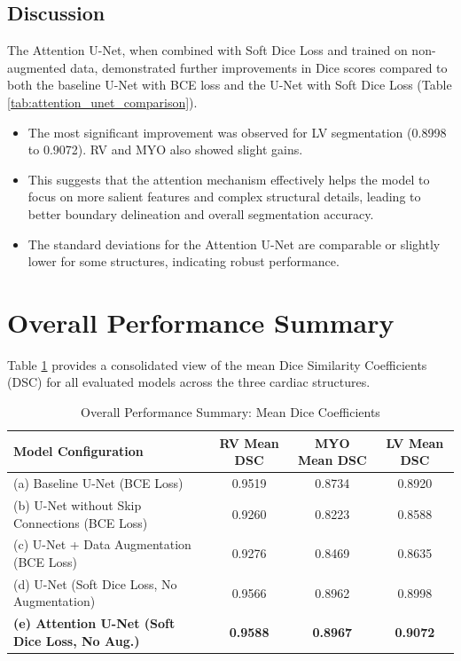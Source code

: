 \documentclass{article}
\begin{document}
\subsection{Discussion}
The Attention U-Net, when combined with Soft Dice Loss and trained on non-augmented data, demonstrated further improvements in Dice scores compared to both the baseline U-Net with BCE loss and the U-Net with Soft Dice Loss (Table \ref{tab:attention_unet_comparison}).
\begin{itemize}
  \item The most significant improvement was observed for LV segmentation (0.8998 to 0.9072). RV and MYO also showed slight gains.
  \item This suggests that the attention mechanism effectively helps the model to focus on more salient features and complex structural details, leading to better boundary delineation and overall segmentation accuracy.
  \item The standard deviations for the Attention U-Net are comparable or slightly lower for some structures, indicating robust performance.
\end{itemize}

\section{Overall Performance Summary}
Table \ref{tab:overall_summary} provides a consolidated view of the mean Dice Similarity Coefficients (DSC) for all evaluated models across the three cardiac structures.

\begin{table}[H]
  \centering
  \caption{Overall Performance Summary: Mean Dice Coefficients}
  \label{tab:overall_summary}
  \begin{tabular}{lccc}
    \toprule
    Model Configuration                                    & RV Mean DSC     & MYO Mean DSC    & LV Mean DSC     \\
    \midrule
    (a) Baseline U-Net (BCE Loss)                          & 0.9519          & 0.8734          & 0.8920          \\
    (b) U-Net without Skip Connections (BCE Loss)          & 0.9260          & 0.8223          & 0.8588          \\
    (c) U-Net + Data Augmentation (BCE Loss)               & 0.9276          & 0.8469          & 0.8635          \\
    (d) U-Net (Soft Dice Loss, No Augmentation)            & 0.9566          & 0.8962          & 0.8998          \\
    \textbf{(e) Attention U-Net (Soft Dice Loss, No Aug.)} & \textbf{0.9588} & \textbf{0.8967} & \textbf{0.9072} \\
    \bottomrule
  \end{tabular}
\end{table}
\end{document}
